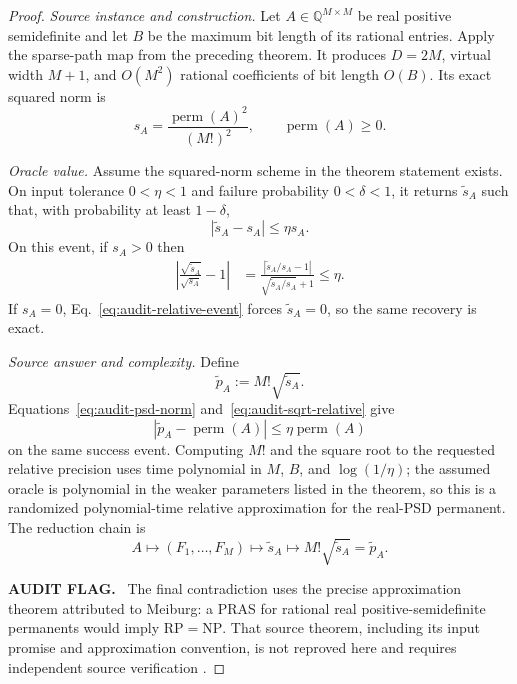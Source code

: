 \documentclass[aps,pra,reprint,superscriptaddress,nofootinbib,longbibliography,showkeys]{revtex4-2}
\theoremstyle{definition}
\newenvironment{auditflag}
  {\par\smallskip\noindent\textbf{AUDIT FLAG.}\ }
  {\par\smallskip}
\newcommand{\perm}{\operatorname{perm}}
\begin{document}
\begin{proof}
\medskip\noindent\textit{Source instance and construction.}\quad
Let $A\in\mathbb Q^{M\times M}$ be real positive semidefinite and let $B$ be
the maximum bit length of its rational entries.  Apply the sparse-path map from
the preceding theorem.  It produces $D=2M$, virtual width $M+1$, and $O(M^2)$
rational coefficients of bit length $O(B)$.  Its exact squared norm is
\begin{equation}
s_A=\frac{\perm(A)^2}{(M!)^2},
\qquad \perm(A)\ge0.
\label{eq:audit-psd-norm}
\end{equation}

\medskip\noindent\textit{Oracle value.}\quad
Assume the squared-norm scheme in the theorem statement exists.  On input
tolerance $0<\eta<1$ and failure probability $0<\delta<1$, it returns
$\widetilde s_A$ such that, with probability at least $1-\delta$,
\begin{equation}
|\widetilde s_A-s_A|\le\eta s_A.
\label{eq:audit-relative-event}
\end{equation}
On this event, if $s_A>0$ then
\begin{align}
\left|\frac{\sqrt{\widetilde s_A}}{\sqrt{s_A}}-1\right|
&=\frac{|\widetilde s_A/s_A-1|}
{\sqrt{\widetilde s_A/s_A}+1}
\le\eta.
\label{eq:audit-sqrt-relative}
\end{align}
If $s_A=0$, Eq.~\eqref{eq:audit-relative-event} forces
$\widetilde s_A=0$, so the same recovery is exact.

\medskip\noindent\textit{Source answer and complexity.}\quad
Define
\begin{equation}
\widetilde p_A:=M!\sqrt{\widetilde s_A}.
\end{equation}
Equations~\eqref{eq:audit-psd-norm} and~\eqref{eq:audit-sqrt-relative} give
\begin{equation}
|\widetilde p_A-\perm(A)|\le\eta\perm(A)
\end{equation}
on the same success event.  Computing $M!$ and the square root to the requested
relative precision uses time polynomial in $M$, $B$, and $\log(1/\eta)$; the
assumed oracle is polynomial in the weaker parameters listed in the theorem,
so this is a randomized polynomial-time relative approximation for the
real-PSD permanent.  The reduction chain is
\begin{equation}
A\longmapsto(F_1,\ldots,F_M)\longmapsto\widetilde s_A
\longmapsto M!\sqrt{\widetilde s_A}=\widetilde p_A.
\end{equation}

\begin{auditflag}
The final contradiction uses the precise approximation theorem attributed to
Meiburg: a PRAS for rational real positive-semidefinite permanents would imply
$\mathrm{RP}=\mathrm{NP}$.  That source theorem, including its input promise
and approximation convention, is not reproved here and requires independent
source verification \cite{Meiburg2023PSDPermanent}.
\end{auditflag}
\end{proof}
\end{document}
